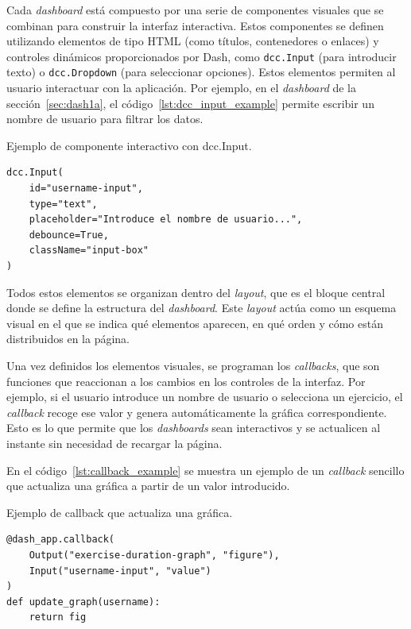 \documentclass[a4paper, 12pt]{book}
\begin{document}
Cada \textit{dashboard} está compuesto por una serie de componentes visuales que se combinan para construir la interfaz interactiva. Estos componentes se definen utilizando elementos de tipo HTML (como títulos, contenedores o enlaces) y controles dinámicos proporcionados por Dash, como \texttt{dcc.Input} (para introducir texto) o \texttt{dcc.Dropdown} (para seleccionar opciones). Estos elementos permiten al usuario interactuar con la aplicación. Por ejemplo, en el \textit{dashboard} de la sección~\ref{sec:dash1a}, el código~\ref{lst:dcc_input_example} permite escribir un nombre de usuario para filtrar los datos.

\begin{listing}[h!]
\caption{Ejemplo de componente interactivo con dcc.Input.}
\label{lst:dcc_input_example}
\begin{verbatim}
dcc.Input(
    id="username-input",
    type="text",
    placeholder="Introduce el nombre de usuario...",
    debounce=True,
    className="input-box"
)
\end{verbatim}
\end{listing}

Todos estos elementos se organizan dentro del \textit{layout}, que es el bloque central donde se define la estructura del \textit{dashboard}. Este \textit{layout} actúa como un esquema visual en el que se indica qué elementos aparecen, en qué orden y cómo están distribuidos en la página.

Una vez definidos los elementos visuales, se programan los \textit{callbacks}, que son funciones que reaccionan a los cambios en los controles de la interfaz. Por ejemplo, si el usuario introduce un nombre de usuario o selecciona un ejercicio, el \textit{callback} recoge ese valor y genera automáticamente la gráfica correspondiente. Esto es lo que permite que los \textit{dashboards} sean interactivos y se actualicen al instante sin necesidad de recargar la página.

En el código~\ref{lst:callback_example} se muestra un ejemplo de un \textit{callback} sencillo que actualiza una gráfica a partir de un valor introducido.

\begin{listing}[h!]
\caption{Ejemplo de callback que actualiza una gráfica.}
\label{lst:callback_example}
\begin{verbatim}
@dash_app.callback(
    Output("exercise-duration-graph", "figure"),
    Input("username-input", "value")
)
def update_graph(username):
    return fig
\end{verbatim}
\end{listing}
\end{document}
